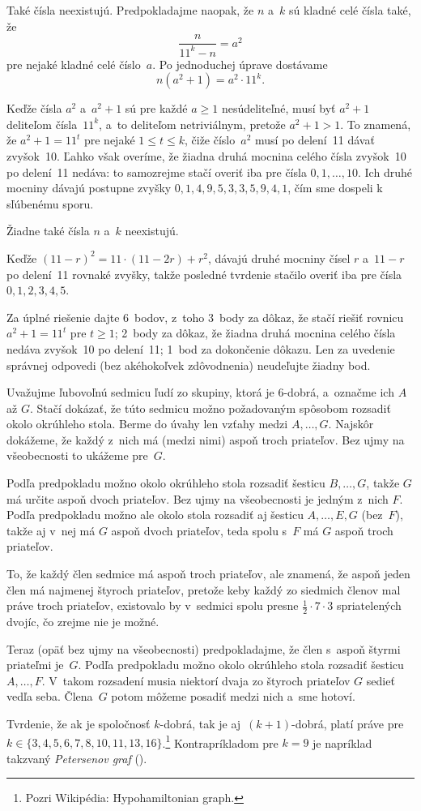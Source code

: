 {%
Také čísla neexistujú.
Predpokladajme naopak, že $n$ a~$k$ sú kladné celé čísla také, že
$$
\frac{n}{11^k-n}=a^2
$$
pre nejaké kladné celé číslo~$a$. Po jednoduchej úprave dostávame
$$
n(a^2+1)=a^2\cdot 11^k.
$$

Keďže čísla $a^2$ a~$a^2+1$ sú pre každé $a\ge 1$ nesúdeliteľné,
musí byť $a^2+1$ deliteľom čísla~$11^k$, a~to deliteľom netriviálnym,
pretože $a^2+1>1$. To znamená, že $a^2+1=11^t$ pre nejaké $1\le t\le k$,
čiže číslo~$a^2$ musí po delení~11 dávať zvyšok~10.
Ľahko však overíme, že žiadna druhá mocnina celého čísla zvyšok~10 po
delení~11 nedáva:
to samozrejme stačí overiť iba pre čísla $0, 1, \dots,10$.
Ich druhé mocniny dávajú postupne zvyšky $0,1,4,9,5,3,3,5,9,4,1$,
čím sme dospeli k sľúbenému sporu.

Žiadne také čísla $n$ a~$k$ neexistujú.

\poznamka
Keďže $(11-r)^2=11\cdot(11-2r)+r^2$,
dávajú druhé mocniny čísel $r$ a~${11-r}$ po delení~11 rovnaké zvyšky,
takže posledné tvrdenie stačilo overiť iba pre čísla $0,1,2,3,4,5$.



\nobreak\medskip\petit\noindent
Za úplné riešenie dajte 6~bodov, z~toho
3~body za dôkaz, že stačí riešiť rovnicu $a^2+1=11^t$ pre $t\ge 1$;
2~body za dôkaz, že žiadna druhá mocnina celého čísla nedáva zvyšok~10
po delení~11;
1~bod za dokončenie dôkazu.
Len za uvedenie správnej odpovedi (bez akéhokoľvek zdôvodnenia) neudeľujte žiadny bod.

\endpetit
}

{%
Uvažujme ľubovoľnú sedmicu ľudí zo skupiny, ktorá je 6-dobrá, a~označme ich
$A$ až $G$. Stačí dokázať, že túto sedmicu možno požadovaným spôsobom
rozsadiť okolo okrúhleho stola. Berme do úvahy len vzťahy medzi $A,\dots,G$.
Najskôr dokážeme, že každý z~nich má (medzi nimi) aspoň troch priateľov.
Bez ujmy na všeobecnosti to ukážeme pre~$G$.

Podľa predpokladu možno okolo okrúhleho stola rozsadiť šesticu
$B,\dots,G$, takže $G$ má určite aspoň dvoch priateľov. Bez ujmy na
všeobecnosti je jedným z~nich $F$. Podľa predpokladu možno ale okolo stola
rozsadiť aj šesticu $A,\dots,E,G$ (bez~$F$), takže aj v~nej má $G$ aspoň
dvoch priateľov, teda spolu s~$F$ má $G$ aspoň troch priateľov.

To, že každý člen sedmice má aspoň troch priateľov, ale
znamená, že aspoň jeden člen má najmenej štyroch priateľov, pretože
keby každý zo siedmich členov mal práve troch priateľov, existovalo by
v~sedmici spolu presne $\frac12\cdot 7\cdot 3$ spriatelených
dvojíc, čo zrejme nie je možné.

Teraz (opäť bez ujmy na všeobecnosti) predpokladajme, že člen s~aspoň štyrmi
priateľmi je~$G$. Podľa predpokladu možno okolo okrúhleho stola rozsadiť
šesticu $A,\dots,F$. V~takom rozsadení musia niektorí dvaja zo štyroch
priateľov $G$ sedieť vedľa seba. Člena~$G$ potom môžeme posadiť medzi nich
a~sme hotoví.

\poznamka
Tvrdenie, že ak je spoločnosť $k$-dobrá, tak je
aj~$(k+1)$-dobrá, platí práve pre
$k\in\{3,4,5,6,7,8,10,11,13,16\}$.\footnote{Pozri Wikipédia:
Hypohamiltonian graph.} Kontrapríkladom pre $k=9$ je napríklad takzvaný
{\it Petersenov graf\/} (\obr).
%
}

